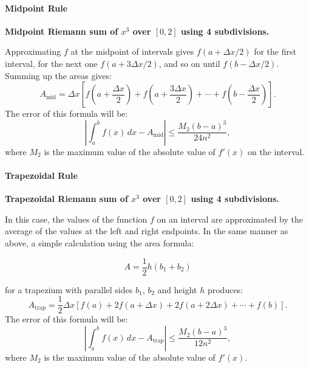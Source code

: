 \paragraph{Midpoint Rule}




\textbf{Midpoint Riemann sum of $x^3$ over $[0,2]$ using 4 subdivisions.}



Approximating $f$ at the midpoint of intervals gives $f(a + \Delta x/2)$ for the first interval, for the next one $f(a + 3\Delta x/2)$, and so on until $f(b - \Delta x/2)$. Summing up the areas gives:
$$
A_\text{mid} = \Delta x \left[f\left(a + \frac{\Delta x}{2}\right) + f\left(a + \frac{3\Delta x}{2}\right) + \cdots + f\left(b - \frac{\Delta x}{2}\right)\right].
$$
The error of this formula will be:
$$
\left|\int_a^b f(x) \, dx - A_\text{mid}\right| \le \frac{M_2 (b-a)^3}{24n^2},
$$
where $M_2$ is the maximum value of the absolute value of $f'(x)$ on the interval.



\paragraph{Trapezoidal Rule}




\textbf{Trapezoidal Riemann sum of $x^3$ over $[0,2]$ using 4 subdivisions.}



In this case, the values of the function $f$ on an interval are approximated by the average of the values at the left and right endpoints. In the same manner as above, a simple calculation using the area formula:



$$A = \frac{1}{2}h(b_1 + b_2)$$



for a trapezium with parallel sides $b_1$, $b_2$ and height $h$ produces:
$$
A_\text{trap} = \frac{1}{2} \Delta x \left[f(a) + 2f(a + \Delta x) + 2f(a + 2\Delta x) + \cdots + f(b)\right].
$$
The error of this formula will be:
$$
\left|\int_a^b f(x) \, dx - A_\text{trap}\right| \le \frac{M_2(b-a)^3}{12n^2},
$$
where $M_2$ is the maximum value of the absolute value of $f'(x)$.



